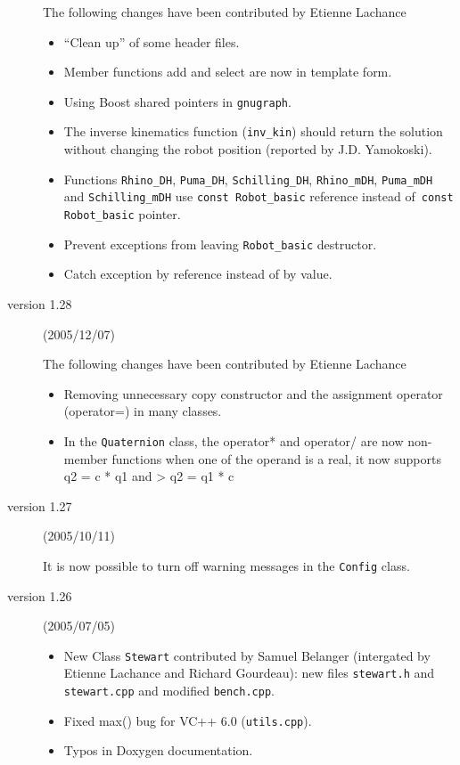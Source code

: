 \documentclass[11pt,fleqn,letterpaper]{report}
\begin{document}
\begin{description}
  The following changes have been contributed by Etienne Lachance
  \begin{itemize}
  \item ``Clean up'' of some header files.
  \item Member functions add and select are now in template form.
  \item Using \textsf{Boost} shared pointers in \texttt{gnugraph}.
  \item The inverse kinematics function (\texttt{inv\_kin}) should
    return the solution without changing the robot position (reported
    by J.D. Yamokoski).
  \item Functions \texttt{Rhino\_DH}, \texttt{Puma\_DH},
    \texttt{Schilling\_DH}, \texttt{Rhino\_mDH}, \texttt{Puma\_mDH}
    and \texttt{Schilling\_mDH} use \texttt{const Robot\_basic}
    reference instead of\texttt{ const Robot\_basic} pointer.
  \item Prevent exceptions from leaving \texttt{Robot\_basic} destructor.
  \item Catch exception by reference instead of by value.
  \end{itemize}
  
\item[version 1.28] (2005/12/07)

  The following changes have been contributed by Etienne Lachance
  \begin{itemize}
  \item Removing unnecessary copy constructor and the assignment
    operator (operator=) in many classes.
  \item In the \texttt{Quaternion} class, the operator* and operator/
    are now non-member functions when one of the operand is a real, it
    now supports q2 = c * q1 and > q2 = q1 * c
  \end{itemize}

\item[version 1.27] (2005/10/11)

  It is now possible to turn off warning messages in the
  \texttt{Config} class.
  
\item[version 1.26] (2005/07/05)
  \begin{itemize}
  \item New Class \texttt{Stewart} contributed by Samuel Belanger
    (intergated by Etienne Lachance and Richard Gourdeau): new files
    \texttt{stewart.h} and \texttt{stewart.cpp} and modified
    \texttt{bench.cpp}.
  \item Fixed max() bug for VC++ 6.0 (\texttt{utils.cpp}).
  \item Typos in Doxygen documentation.
  \end{itemize}
  

\end{description}
\end{document}
